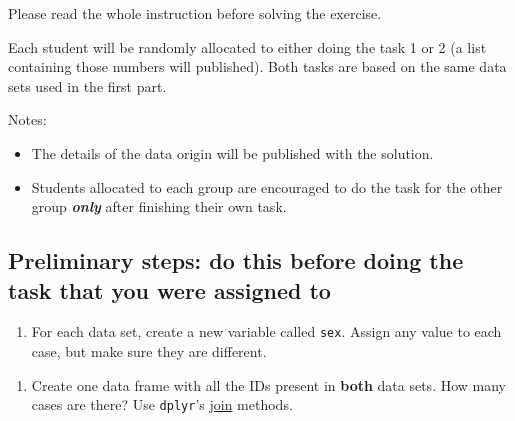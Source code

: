 \documentclass[
]{book}
\newenvironment{Shaded}{\begin{snugshade}}{\end{snugshade}}
\newcommand{\NormalTok}[1]{#1}
\newcommand{\OtherTok}[1]{\textcolor[rgb]{0.56,0.35,0.01}{#1}}
\newcommand{\SpecialCharTok}[1]{\textcolor[rgb]{0.81,0.36,0.00}{\textbf{#1}}}
\newcommand{\StringTok}[1]{\textcolor[rgb]{0.31,0.60,0.02}{#1}}
\providecommand{\tightlist}{%
  \setlength{\itemsep}{0pt}\setlength{\parskip}{0pt}}
\begin{document}
Please read the whole instruction before solving the exercise.

Each student will be randomly allocated to either doing the task 1 or 2 (a list containing those numbers will published). Both tasks are based on the same data sets used in the first part.

Notes:

\begin{itemize}
\tightlist
\item
  The details of the data origin will be published with the solution.
\item
  Students allocated to each group are encouraged to do the task for the other group \textbf{\emph{only}} after finishing their own task.
\end{itemize}

\hypertarget{preliminary-steps-do-this-before-doing-the-task-that-you-were-assigned-to}{%
\subsection{Preliminary steps: do this before doing the task that you were assigned to}\label{preliminary-steps-do-this-before-doing-the-task-that-you-were-assigned-to}}

\begin{enumerate}
\def\labelenumi{\arabic{enumi}.}
\tightlist
\item
  For each data set, create a new variable called \texttt{sex}. Assign any value to each case, but make sure they are different.
\end{enumerate}

\begin{Shaded}
\end{Shaded}

\begin{enumerate}
\def\labelenumi{\arabic{enumi}.}
\setcounter{enumi}{1}
\tightlist
\item
  Create one data frame with all the IDs present in \textbf{both} data sets. How many cases are there? Use \texttt{dplyr}'s \href{https://www.geeksforgeeks.org/joining-data-in-r-with-dplyr-package/}{join} methods.
\end{enumerate}
\end{document}
